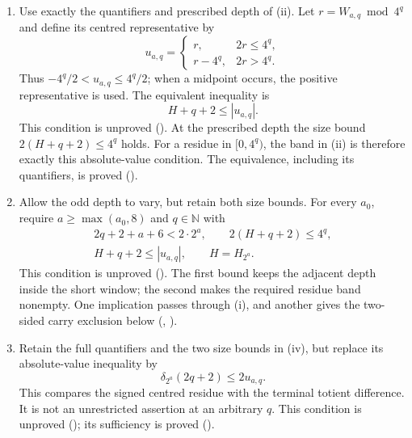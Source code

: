 \begin{enumerate}
\item[(iii)] Use exactly the quantifiers and prescribed depth of (ii).
Let $r=W_{a,q}\bmod4^q$ and define its centred representative by
\[
 u_{a,q}=\begin{cases}
 r,&2r\le4^q,\\
 r-4^q,&2r>4^q.
 \end{cases}
\]
Thus $-4^q/2<u_{a,q}\le4^q/2$; when a midpoint occurs, the positive
representative is used. The equivalent inequality is
\[
 H+q+2\le |u_{a,q}|.
\]
This condition is unproved
().
At the prescribed depth the size bound $2(H+q+2)\le4^q$ holds.
For a residue in $[0,4^q)$, the band in (ii) is therefore exactly
this absolute-value condition. The equivalence, including its
quantifiers, is proved
().

\item[(iv)] Allow the odd depth to vary, but retain both size bounds.
For every $a_0$, require $a\ge\max(a_0,8)$ and $q\in\mathbb N$ with
\[
\begin{gathered}
 2q+2+a+6<2\cdot2^a,\qquad 2(H+q+2)\le4^q,\\
 H+q+2\le |u_{a,q}|,\qquad H=H_{2^a}.
\end{gathered}
\]
This condition is unproved
().
The first bound keeps the adjacent depth inside the short window;
the second makes the required residue band nonempty. One implication
passes through (i), and another gives the two-sided carry exclusion
below
(,
).

\item[(v)] Retain the full quantifiers and the two size bounds in
(iv), but replace its absolute-value inequality by
\[
 \delta_{2^a}(2q+2)\le2u_{a,q}.
\]
This compares the signed centred residue with the terminal totient
difference. It is not an unrestricted assertion at an arbitrary $q$.
This condition is unproved
();
its sufficiency is proved
().
\end{enumerate}

